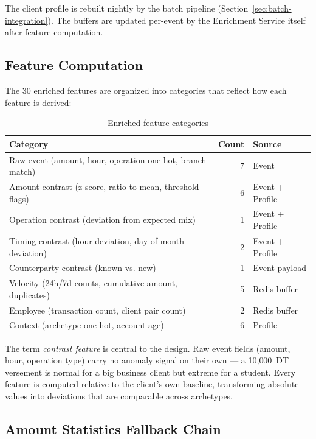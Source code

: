 The client profile is rebuilt nightly by the batch pipeline
(Section~\ref{sec:batch-integration}). The buffers are updated per-event by
the Enrichment Service itself after feature computation.

\subsection{Feature Computation}

The 30 enriched features are organized into categories that reflect how each
feature is derived:

\begin{table}[H]
\centering
\caption{Enriched feature categories}
\label{tab:enriched-features-ch5}
\begin{tabular}{@{}lrl@{}}
\toprule
\textbf{Category} & \textbf{Count} & \textbf{Source} \\
\midrule
Raw event (amount, hour, operation one-hot, branch match) & 7 & Event \\
Amount contrast (z-score, ratio to mean, threshold flags) & 6 & Event + Profile \\
Operation contrast (deviation from expected mix)          & 1 & Event + Profile \\
Timing contrast (hour deviation, day-of-month deviation)  & 2 & Event + Profile \\
Counterparty contrast (known vs. new)                     & 1 & Event payload \\
Velocity (24h/7d counts, cumulative amount, duplicates)   & 5 & Redis buffer \\
Employee (transaction count, client pair count)            & 2 & Redis buffer \\
Context (archetype one-hot, account age)                  & 6 & Profile \\
\bottomrule
\end{tabular}
\end{table}

The term \emph{contrast feature} is central to the design. Raw event fields
(amount, hour, operation type) carry no anomaly signal on their own --- a
10{,}000~DT versement is normal for a big business client but extreme for a
student. Every feature is computed relative to the client's own baseline,
transforming absolute values into deviations that are comparable across
archetypes.

\subsection{Amount Statistics Fallback Chain}


